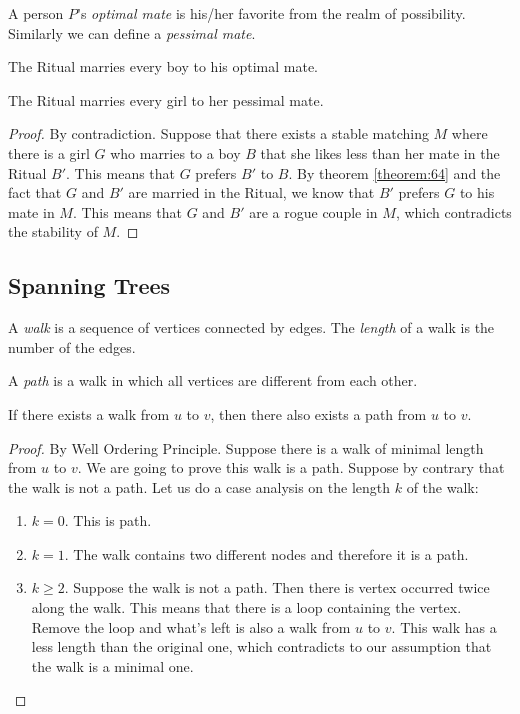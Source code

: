 \documentclass[11pt]{article}
\begin{document}
\begin{definition}
A person $P$'s \emph{optimal mate} is his/her favorite from the realm of possibility. Similarly we
can define a \emph{pessimal mate}.
\end{definition}

\begin{theorem} \label{theorem:64}
The Ritual marries every boy to his optimal mate.
\end{theorem}

\begin{theorem}
The Ritual marries every girl to her pessimal mate.
\end{theorem}

\begin{proof}
By contradiction. Suppose that there exists a stable matching $M$ where there is a girl $G$ who
marries to a boy $B$ that she likes less than her mate in the Ritual $B'$. This means that $G$
prefers $B'$ to $B$. By theorem \ref{theorem:64} and the fact that $G$ and $B'$ are married in the
Ritual, we know that $B'$ prefers $G$ to his mate in $M$. This means that $G$ and $B'$ are a rogue
couple in $M$, which contradicts the stability of $M$.
\end{proof}

\subsection{Spanning Trees}

\begin{definition}
A \emph{walk} is a sequence of vertices connected by edges. The \emph{length} of a walk is the number
of the edges.
\end{definition}

\begin{definition}
A \emph{path} is a walk in which all vertices are different from each other.
\end{definition}

\begin{lemma}
If there exists a walk from $u$ to $v$, then there also exists a path from $u$ to $v$.
\end{lemma}

\begin{proof}
By Well Ordering Principle. Suppose there is a walk of minimal length from $u$ to $v$. We are going
to prove this walk is a path. Suppose by contrary that the walk is not a path. Let us do a case
analysis on the length $k$ of the walk:
\begin{enumerate}
\item $k=0$. This is path.
\item $k=1$. The walk contains two different nodes and therefore it is a path.
\item $k \geq 2$. Suppose the walk is not a path. Then there is vertex occurred twice along the walk.
This means that there is a loop containing the vertex. Remove the loop and what's left is also a walk
from $u$ to $v$. This walk has a less length than the original one, which contradicts to our
assumption that the walk is a minimal one.
\end{enumerate}
\end{proof}
\end{document}
